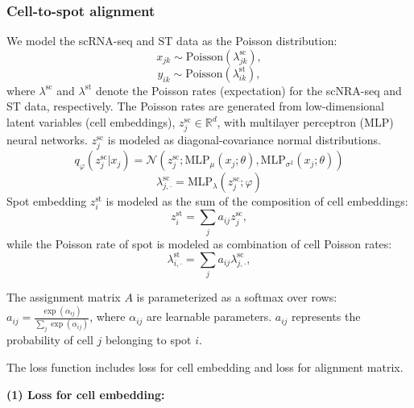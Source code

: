 \documentclass[10pt,a4paper]{article}
\begin{document}
\subsubsection{ Cell-to-spot alignment}
We model the scRNA-seq and ST data as the Poisson distribution:
\begin{equation}
x_{jk} \sim \mathrm{Poisson}\left( \lambda_{jk}^{\mathrm{sc}} \right),
\end{equation}
\begin{equation}
y_{ik} \sim \mathrm{Poisson}\left( \lambda_{ik}^{\mathrm{st}} \right),
\end{equation}
where $\lambda^{\mathrm{sc}}$ and $\lambda^{\mathrm{st}}$ denote the Poisson rates (expectation) for the scNRA-seq and ST data, respectively. The Poisson rates are generated from low-dimensional latent variables (cell embeddings), $z_{j}^{\mathrm{sc}} \in \mathbb{R}^{d}$, with multilayer perceptron (MLP) neural networks. $z_{j}^{\mathrm{sc}}$ is modeled as diagonal-covariance normal distributions.
\begin{equation}
q_{\varphi}\left( z_{j}^{\mathrm{sc}} | x_{j} \right) = \mathcal{N}\left( z_{j}^{\mathrm{sc}}; \mathrm{MLP}_{\mu}(x_{j};\theta), \mathrm{MLP}_{\sigma^{2}}(x_{j};\theta) \right)
\end{equation}
\begin{equation}
\lambda_{j, \cdot}^{\mathrm{sc}} = \mathrm{MLP}_{\lambda}\left( z_{j}^{\mathrm{sc}}; \varphi \right)
\end{equation}
Spot embedding $z_{i}^{\mathrm{st}}$ is modeled as the sum of the composition of cell embeddings:
\begin{equation}
z_{i}^{\mathrm{st}} = \sum_{j} a_{ij} z_{j}^{\mathrm{sc}},
\end{equation}
while the Poisson rate of spot is modeled as combination of cell Poisson rates:
\begin{equation}
\lambda_{i, \cdot}^{\mathrm{st}} = \sum_{j} a_{ij} \lambda_{j, \cdot}^{\mathrm{sc}},
\end{equation}

The assignment matrix $A$ is parameterized as a softmax over rows: $a_{ij} = \frac{\exp(\alpha_{ij})}{\sum_{j} \exp(\alpha_{ij})}$, where $\alpha_{ij}$ are learnable parameters. $a_{ij}$ represents the probability of cell $j$ belonging to spot $i$.

The loss function includes loss for cell embedding and loss for alignment matrix.

\textbf{(1) Loss for cell embedding:}
\end{document}
